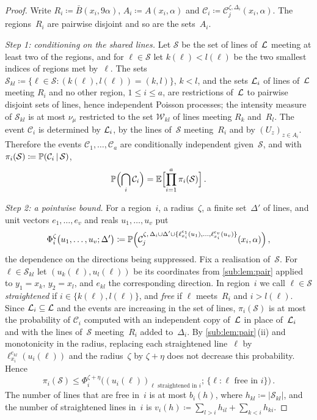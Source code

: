 \documentclass[11pt,letterpaper]{article}
\newcommand{\cS}{\mathcal S}
\newcommand{\cW}{\mathcal W}
\newcommand{\cC}{\mathcal C}
\begin{document}
\begin{proof}
Write $R_i\coloneqq \bar B(x_i,9\alpha)$, $A_i\coloneqq A(x_i,\alpha)$ and $\cC_i\coloneqq \cC_j^{\zeta,\Delta_i}(x_i,\alpha)$. The regions~$R_i$ are pairwise disjoint and so are the sets~$A_i$.

\emph{Step 1: conditioning on the shared lines.} Let $\cS$ be the set of lines of~$\mathcal L$ meeting at least two of the regions, and for $\ell\in\cS$ let $k(\ell)<l(\ell)$ be the two smallest indices of regions met by~$\ell$. The sets $\cS_{kl}\coloneqq\{\ell\in\cS\colon(k(\ell),l(\ell))=(k,l)\}$, $k<l$, and the sets $\mathcal L_i$ of lines of~$\mathcal L$ meeting $R_i$ and no other region, $1\le i\le a$, are restrictions of~$\mathcal L$ to pairwise disjoint sets of lines, hence independent Poisson processes; the intensity measure of $\cS_{kl}$ is at most $\nu_\mu$ restricted to the set $\cW_{kl}$ of lines meeting $R_k$ and~$R_l$. The event $\cC_i$ is determined by $\mathcal L_i$, by the lines of~$\cS$ meeting~$R_i$ and by $(U_z)_{z\in A_i}$. Therefore the events $\cC_1,\dots,\cC_a$ are conditionally independent given~$\cS$, and with $\pi_i(\cS)\coloneqq\P(\cC_i\,\vert\,\cS)$,
\begin{equation}
\label{sub:eq:cond}
  \P\Bigl(\bigcap_i\cC_i\Bigr)=\E\Bigl[\prod_{i=1}^a\pi_i(\cS)\Bigr]\,.
\end{equation}

\emph{Step 2: a pointwise bound.} For a region~$i$, a radius~$\zeta$, a finite set~$\Delta'$ of lines, and unit vectors $e_1,\dots,e_v$ and reals $u_1,\dots,u_v$ put
\begin{equation*}
  \Phi_i^\zeta\bigl(u_1,\dots,u_v;\Delta'\bigr)\coloneqq\P\Bigl(\cC_j^{\zeta,\,\Delta_i\cup\Delta'\cup\{\ell^{e_1}_{x_i}(u_1),\dots,\ell^{e_v}_{x_i}(u_v)\}}(x_i,\alpha)\Bigr)\,,
\end{equation*}
the dependence on the directions being suppressed. Fix a realisation of~$\cS$. For $\ell\in\cS_{kl}$ let $(u_k(\ell),u_l(\ell))$ be its coordinates from \cref{sub:lem:pair} applied to $y_1=x_k$, $y_2=x_l$, and $e_{kl}$ the corresponding direction. In region~$i$ we call $\ell\in\cS$ \emph{straightened} if $i\in\{k(\ell),l(\ell)\}$, and \emph{free} if $\ell$ meets~$R_i$ and $i>l(\ell)$. Since $\mathcal L_i\subseteq\mathcal L$ and the events are increasing in the set of lines, $\pi_i(\cS)$ is at most the probability of $\cC_i$ computed with an independent copy of~$\mathcal L$ in place of~$\mathcal L_i$ and with the lines of~$\cS$ meeting~$R_i$ added to~$\Delta_i$. By \cref{sub:lem:pair}\,(ii) and monotonicity in the radius, replacing each straightened line~$\ell$ by $\ell^{e_{kl}}_{x_i}(u_i(\ell))$ and the radius~$\zeta$ by $\zeta+\eta$ does not decrease this probability. Hence
\begin{equation}
\label{sub:eq:pointwise}
  \pi_i(\cS)\le\Phi_i^{\zeta+\eta}\bigl((u_i(\ell))_{\ell\text{ straightened in }i};\,\{\ell\colon\ell\text{ free in }i\}\bigr)\,.
\end{equation}
The number of lines that are free in~$i$ is at most $b_i(h)$, where $h_{kl}\coloneqq\lvert\cS_{kl}\rvert$, and the number of straightened lines in~$i$ is $v_i(h)\coloneqq\sum_{l>i}h_{il}+\sum_{k<i}h_{ki}$.


\end{proof}
\end{document}

